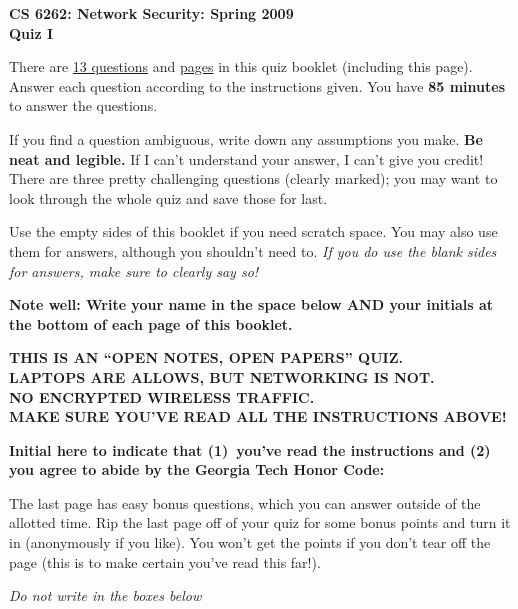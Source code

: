 \documentclass[11pt]{article}
\newcounter{answer}
\begin{document}
\begin{center}
{\Large{\bf CS 6262: Network Security: Spring 2009} \\
 \vspace{.15in} \Huge{\bf Quiz I}} 
\vspace{.2in}

\begin{boxedminipage}[h]{6in}
There are \underline{13 questions} and
  \underline{\pageref{lastpage} pages} in this quiz booklet (including
  this page).  Answer each question according to the instructions given.
  You have {\bf 85 minutes} to answer the questions.



\vspace{.1in} 
If you find a question ambiguous, write down any
assumptions you make.  {\bf Be neat and legible.}  If I can't
understand your answer, I can't give you credit!  There are three pretty
challenging questions (clearly marked); you may want to look through the
whole quiz and save those for last.

\vspace{.1in} 
Use the empty sides of this booklet if you need scratch space.  You
may also use them for answers, although you shouldn't need to.  {\em If you
do use the blank sides for answers, make sure to clearly say so!}

\vspace{.1in} 
{\bf Note well: Write your name in the space below AND your initials at the bottom of each
page of this booklet.}

\begin{center}{\bf THIS IS AN ``OPEN NOTES, OPEN PAPERS'' QUIZ.\\
LAPTOPS ARE ALLOWS, BUT NETWORKING IS NOT. \\
NO ENCRYPTED WIRELESS TRAFFIC. \\
MAKE SURE YOU'VE READ ALL THE INSTRUCTIONS ABOVE!}
\end{center}
{\bf Initial here to indicate that (1)~you've read the instructions and (2)~
you agree to abide by the Georgia Tech Honor Code: }

\vspace{0in} The last page has easy bonus questions, which you can
answer outside of the allotted time.  Rip the last page off of your
quiz for some bonus points and turn it in (anonymously if you like).  You
won't get the points if you don't tear off the page (this is to
make certain you've read this far!).

\end{boxedminipage}
\end{center}
\vspace*{0.25in}
\begin{center}
{\it Do not write in the boxes below}
\end{center}
\end{document}
